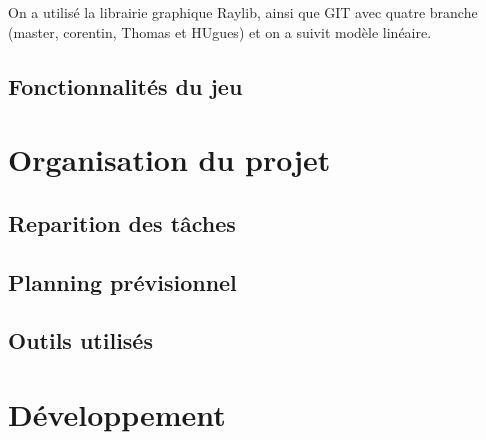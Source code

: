 \documentclass[a4paper,11pt]{article}
\begin{document}
\smallskip

On a utilisé la librairie graphique Raylib, ainsi que GIT avec quatre branche (master, corentin, Thomas et HUgues) et on a suivit modèle linéaire.

\subsection{Fonctionnalités du jeu}

\section{Organisation du projet}

\subsection{Reparition des tâches}

\subsection{Planning prévisionnel}

\subsection{Outils utilisés}

\section{Développement}
\end{document}
